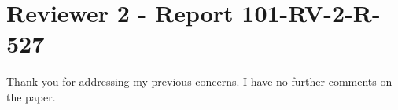 \section{Reviewer 2 - Report 101-RV-2-R-527}
%

Thank you for addressing my previous concerns. I have no further comments on the paper.

~

